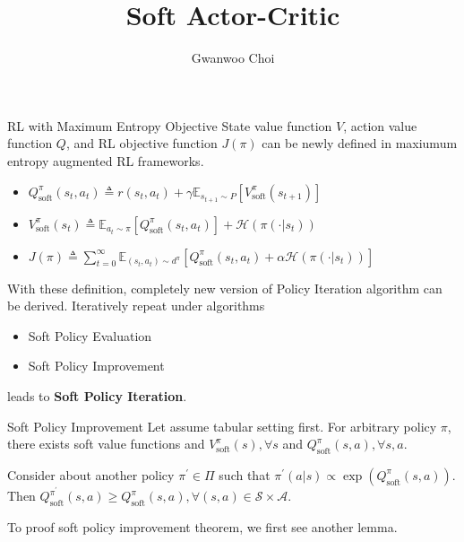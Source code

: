 \documentclass[8pt]{beamer}
\title{Soft Actor-Critic}
\author{Gwanwoo Choi}
\begin{document}
\begin{frame}
    \titlepage
\end{frame}


\begin{frame}{RL with Maximum Entropy Objective}
State value function $V$, action value function $Q$, and RL objective function $J(\pi)$ can be newly defined in maxiumum entropy augmented RL frameworks.

\bigskip

    \begin{itemize}
        \item \(
            Q^\pi_\text{soft}(s_t, a_t) \triangleq r(s_t,a_t) + \gamma \mathbb{E}_{s_{t+1} \sim P}[V^\pi_\text{soft}(s_{t+1})]
            \)
        \item \(
            V^\pi_\text{soft}(s_t) \triangleq \mathbb{E}_{a_t \sim \pi}[Q^\pi_\text{soft} (s_t,a_t)] + \mathcal{H}(\pi (\cdot | s_t))
            \)
        \item \(J(\pi) \triangleq \sum_{t=0}^\infty \mathbb{E}_{(s_t,a_t) \sim d^\pi} [Q^\pi_\text{soft} (s_t, a_t) + \alpha \mathcal{H}(\pi(\cdot | s_t))]
        \)
    \end{itemize}

\bigskip
With these definition, completely new version of Policy Iteration algorithm can be derived. Iteratively repeat under algorithms
\begin{itemize}
    \item Soft Policy Evaluation
    \item Soft Policy Improvement
\end{itemize}
leads to \textbf{Soft Policy Iteration}.

\end{frame}

\begin{frame}{Soft Policy Improvement}
Let assume tabular setting first. For arbitrary policy \(\pi\), there exists soft value functions and \(V^\pi_\text{soft} (s), \forall s\) and $Q^\pi_\text{soft}(s, a), \forall s, a$.

\bigskip

\begin{theorem}
    Consider about another policy \(\pi^\prime \in \Pi\) such that \(\pi^\prime(a|s) \propto \exp{(Q^\pi_\text{soft}(s, a))} \). Then
    \(Q^{\pi^\prime}_\text{soft}(s,a) \geq Q^{\pi}_\text{soft}(s,a), \forall (s,a) \in \mathcal{S}\times\mathcal{A}\).
\end{theorem}

To proof soft policy improvement theorem, we first see another lemma.

\end{frame}
\end{document}
